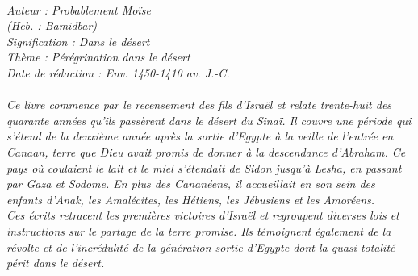 \BFont
\noindent\hrulefill
{\footnotesize
\textit{
\bigskip
{\centering{}
\\Auteur : Probablement Moïse
\\(Heb. : Bamidbar)
\\Signification : Dans le désert
\\Thème : Pérégrination dans le désert
\\Date de rédaction : Env. 1450-1410 av. J.-C.\\}
}
\textit{
\\Ce livre commence par le recensement des fils d'Israël et relate trente-huit des quarante années qu'ils passèrent dans le désert du Sinaï. Il couvre une période qui s'étend de la deuxième année après la sortie d'Egypte à la veille de l'entrée en Canaan, terre que Dieu avait promis de donner à la descendance d'Abraham. Ce pays où coulaient le lait et le miel s'étendait de Sidon jusqu'à Lesha, en passant par Gaza et Sodome. En plus des Cananéens, il accueillait en son sein des enfants d'Anak, les Amalécites, les Hétiens, les Jébusiens et les Amoréens.
\\Ces écrits retracent les premières victoires d'Israël et regroupent diverses lois et instructions sur le partage de la terre promise. Ils témoignent également de la révolte et de l'incrédulité de la génération sortie d'Egypte dont la quasi-totalité périt dans le désert.\bigskip
}
}
\par\nobreak\noindent\hrulefill

